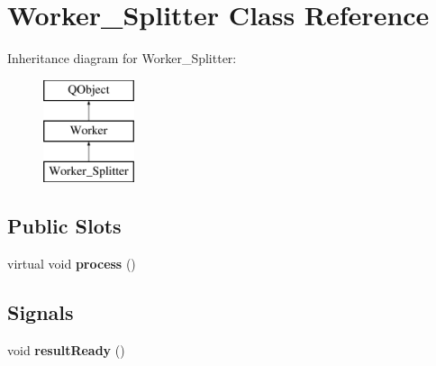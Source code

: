 \hypertarget{classWorker__Splitter}{}\section{Worker\+\_\+\+Splitter Class Reference}
\label{classWorker__Splitter}
Inheritance diagram for Worker\+\_\+\+Splitter\+:\begin{figure}[H]
\begin{center}
\leavevmode
\includegraphics[height=3.000000cm]{classWorker__Splitter}
\end{center}
\end{figure}
\subsection*{Public Slots}
\begin{DoxyCompactItemize}
\item 
\mbox{\label{classWorker__Splitter_affc7c9660d9fea2948add9c1a60baa84}} 
virtual void {\bfseries process} ()
\end{DoxyCompactItemize}
\subsection*{Signals}
\begin{DoxyCompactItemize}
\item 
\mbox{\label{classWorker_a95f9f660a4f74f24ae5b8470fa1e4050}} 
void {\bfseries result\+Ready} ()
\end{DoxyCompactItemize}
